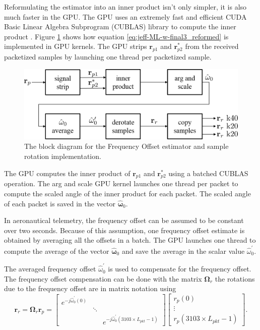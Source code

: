 Reformulating the estimator into an inner product isn't only simpler, it is also much faster in the GPU.
The GPU uses an extremely fast and efficient CUDA Basic Linear Algebra Subprogram (CUBLAS) library to compute the inner product \cite{nvidia-CUDAdoc:2015}.
Figure \ref{fig:frequencyOffsetBlock} shows how equation \eqref{eq:jeff-ML-w-final3_reformed} is implemented in GPU kernels.
The GPU strips $\mathbf{r}_{p1}$ and $\mathbf{r}^\ast_{p2}$ from the received packetized samples by launching one thread per packetized sample.
\begin{figure}
	\centering\includegraphics[width=\textwidth/10*8]{figures/gpu/frequencyOffsetBlock.png}
	\caption{The block diagram for the Frequency Offset estimator and sample rotation implementation.}
	\label{fig:frequencyOffsetBlock}
\end{figure}

The GPU computes the inner product of $\mathbf{r}_{p1}$ and $\mathbf{r}^\ast_{p2}$ using a batched CUBLAS operation.
The arg and scale GPU kernel launches one thread per packet to compute the scaled angle of the inner product for each packet.
The scaled angle of each packet is saved in the vector $\hat{\boldsymbol{\omega}}_0$.

In aeronautical telemetry, the frequency offset can be assumed to be constant over two seconds.
Because of this assumption, one frequency offset estimate is obtained by averaging all the offsets in a batch.
The GPU launches one thread to compute the average of the vector $\hat{\boldsymbol{\omega}}_0$ and save the average in the scalar value $\hat{\omega}^\prime_0$.

The averaged frequency offset $\hat{\omega}^\prime_0$ is used to compensate for the frequency offset.
The frequency offset compensation can be done with the matrix $\boldsymbol{\Omega}_r$ the rotations due to the frequency offset are in matrix notation using 
\begin{equation}
	\boldsymbol{r}_r = \boldsymbol{\Omega}_r \boldsymbol{r}_p = 
	\begin{bmatrix} e^{-j\hat{\omega}^\prime_0(0)} & & \\ & \ddots & \\ & & e^{-j\hat{\omega}^\prime_0(3103\times L_{pkt} -1)} \end{bmatrix}
\begin{bmatrix}
r_p(0) 			\\
\vdots			\\
r_p(3103\times L_{pkt} -1)
\end{bmatrix}.
	\label{eq:jeff-Omega_0-matrix1}
\end{equation}

